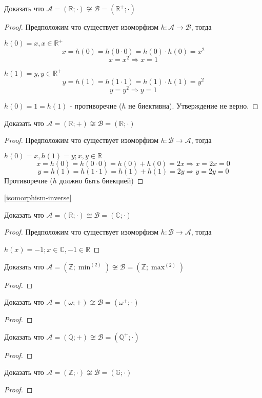 \documentclass[../main/document.tex]{subfiles}
\begin{document}
\begin{exm}
Доказать что $\mathcal{A}=(\mathbb{R};\cdot)\not\cong\mathcal{B}=(\mathbb{R}^{+};\cdot)$
\begin{proof}
Предположим что существует изоморфизм $h:\mathcal{A}\rightarrow \mathcal{B}$, тогда

$h(0)=x, x\in \mathbb{R}^{+}$
$$x=h(0)=h(0\cdot 0)=h(0)\cdot h(0)=x^2$$
$$x=x^2\Rightarrow x=1$$

$h(1)=y, y\in \mathbb{R}^{+} $
$$y=h(1)=h(1\cdot 1)=h(1)\cdot h(1)=y^2$$
$$y=y^2\Rightarrow y=1$$

$h(0)=1=h(1)$ - противоречие ($h$ не биективна). Утверждение не верно.
\end{proof}
\end{exm}
\begin{exm}
Доказать что $\mathcal{A}=(\mathbb{R};+)\not\cong\mathcal{B}=(\mathbb{R};\cdot)$
\begin{proof}
Предположим что существует изоморфизм $h:\mathcal{B}\rightarrow \mathcal{A}$, тогда

$h(0)=x, h(1)=y; x,y\in \mathbb{R}$
$$x=h(0)=h(0\cdot 0)=h(0)+ h(0)=2x\Rightarrow x=2x=0$$
$$y=h(1)=h(1\cdot 1)=h(1)+ h(1)=2y\Rightarrow y=2y=0$$
Противоречие ($h$ должно быть биекцией)
\end{proof}
\end{exm}

\ref{isomorphism-inverse}

\begin{exm}
Доказать что $\mathcal{A}=(\mathbb{R};\cdot)\cong\mathcal{B}=(\mathbb{C};\cdot)$
\begin{proof}
Предположим что существует изоморфизм $h:\mathcal{B}\rightarrow \mathcal{A}$, тогда

$h(x)=-1; x\in \mathbb{C},-1\in \mathbb{R}$

\end{proof}
\end{exm}

\begin{exm}
Доказать что $\mathcal{A}=(\mathbb{Z};{\operatorname{min}}^{(2)})\not\cong\mathcal{B}=(\mathbb{Z};{\operatorname{max}}^{(2)})$
\begin{proof}

\end{proof}
\end{exm}

\begin{exm}
Доказать что $\mathcal{A}=(\omega;+)\not\cong\mathcal{B}=(\omega^+;\cdot)$
\begin{proof}

\end{proof}
\end{exm}

\begin{exm}
Доказать что $\mathcal{A}=(\mathbb{Q};+)\not\cong\mathcal{B}=(\mathbb{Q}^+;\cdot)$
\begin{proof}

\end{proof}
\end{exm}

\begin{exm}
Доказать что $\mathcal{A}=(\mathbb{Z};\cdot)\not\cong\mathcal{B}=(\mathbb{G};\cdot)$
\begin{proof}

\end{proof}
\end{exm}
\end{document}
